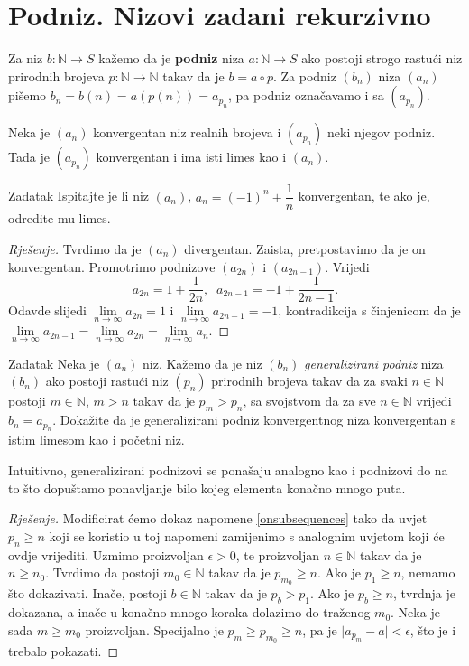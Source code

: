 \section{Podniz. Nizovi zadani rekurzivno}
\begin{definition}
Za niz \(b : \mathbb{N}\to S\) kažemo da je \textbf{podniz} niza \(a :\mathbb{N}\to S\) ako postoji strogo rastući niz prirodnih brojeva \(p : \mathbb{N}\to \mathbb{N}\) takav da je \(b=a\circ p\). Za podniz \((b_n)\) niza \((a_n)\) pišemo \(b_n=b(n)=a\left(p(n)\right)=a_{p_n}\), pa podniz označavamo i sa \((a_{p_n})\).
\end{definition}
\begin{remark}
\label{onsubsequences}
Neka je \((a_n)\) konvergentan niz realnih brojeva i \((a_{p_n})\) neki njegov podniz. Tada je \((a_{p_n})\) konvergentan i ima isti limes kao i \((a_n)\).
\end{remark}
\begin{exercise}{Zadatak}
Ispitajte je li niz \((a_n)\), \(a_n=(-1)^n+\dfrac{1}{n}\) konvergentan, te ako je, odredite mu limes.
\end{exercise}
\begin{proof}[Rješenje]
Tvrdimo da je \((a_n)\) divergentan. Zaista, pretpostavimo da je on konvergentan. Promotrimo podnizove \((a_{2n})\) i \((a_{2n-1})\). Vrijedi
\[a_{2n}=1+\dfrac{1}{2n},\;\;
a_{2n-1}=-1+\dfrac{1}{2n-1}.\]
Odavde slijedi \(\lim\limits_{n\to \infty}{a_{2n}}=1\) i \(\lim\limits_{n\to \infty}{a_{2n-1}}=-1\), kontradikcija s činjenicom da je \(\lim\limits_{n\to \infty}{a_{2n-1}}=\lim\limits_{n\to \infty}{a_{2n}}=\lim\limits_{n\to \infty}{a_{n}}\).
\end{proof}
\begin{exercise}{Zadatak}
\label{generalizedsubsequences}
Neka je $(a_n)$ niz. Kažemo da je niz $(b_n)$ \textit{generalizirani podniz} niza $(b_n)$ ako postoji rastući niz $(p_n)$ prirodnih brojeva takav da za svaki $n\in \mathbb{N}$ postoji $m\in \mathbb{N}$, $m>n$ takav da je $p_m>p_n$, sa svojstvom da za sve $n\in \mathbb{N}$ vrijedi $b_n=a_{p_n}$. Dokažite da je generalizirani podniz konvergentnog niza konvergentan s istim limesom kao i početni niz.
\end{exercise}
\begin{remark}
Intuitivno, generalizirani podnizovi se ponašaju analogno kao i podnizovi do na to što dopuštamo ponavljanje bilo kojeg elementa konačno mnogo puta.
\end{remark}
\begin{proof}[Rješenje]
Modificirat ćemo dokaz napomene \ref{onsubsequences} tako da uvjet $p_n\geq n$ koji se koristio u toj napomeni zamijenimo s analognim uvjetom koji će ovdje vrijediti. Uzmimo proizvoljan $\epsilon>0$, te proizvoljan $n\in \mathbb{N}$ takav da je $n\geq n_0$. Tvrdimo da postoji $m_0\in \mathbb{N}$ takav da je $p_{m_0}\geq n$. Ako je $p_1\geq n$, nemamo što dokazivati. Inače, postoji $b\in \mathbb{N}$ takav da je $p_{b}>p_1$. Ako je $p_{b}\geq n$, tvrdnja je dokazana, a inače u konačno mnogo koraka dolazimo do traženog $m_0$. Neka je sada $m\geq m_0$ proizvoljan. Specijalno je $p_m\geq p_{m_0}\geq n$, pa je $\lvert a_{p_m}-a\rvert<\epsilon$, što je i trebalo pokazati.
\end{proof}
